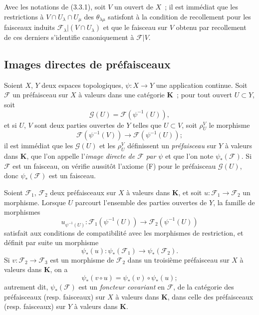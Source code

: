 \begin{env}[3.3.3]
\label{0.3.3.3-fr}
Avec les notations de (3.3.1), soit $V$ un ouvert de $X$~; il est immédiat que
les restrictions à $V\cap U_\lambda\cap U_\mu$ des $\theta_{\lambda\mu}$
satisfont à la condition de recollement pour les faisceaux induits
$\mathcal{F}_\lambda|(V\cap U_\lambda)$ et que le faisceau sur $V$ obtenu par
recollement de ces derniers s'identifie canoniquement à $\mathcal{F}|V$.
\end{env}

\subsection{Images directes de préfaisceaux}
\label{subsection:0.3.4-fr}

\begin{env}[3.4.1]
\label{0.3.4.1-fr}
Soient $X$, $Y$ deux espaces topologiques, $\psi:X\to Y$ une application
continue. Soit $\mathcal{F}$ un préfaisceau sur $X$ à valeurs dans une
catégorie $\mathbf{K}$~; pour tout ouvert $U\subset Y$, soit
\[
  \mathcal{G}(U)=\mathcal{F}(\psi^{-1}(U)),
\]
et si $U$, $V$ sont deux parties ouvertes de $Y$ telles que $U\subset V$, soit
$\rho_U^V$ le morphisme
\[
  \mathcal{F}(\psi^{-1}(V))\to\mathcal{F}(\psi^{-1}(U));
\]
il est immédiat que les $\mathcal{G}(U)$ et les $\rho_U^V$ définissent un
\emph{préfaisceau} sur $Y$ à valeurs dans $\mathbf{K}$, que l'on appelle
l'\emph{image directe de $\mathcal{F}$ par $\psi$} et que l'on note
$\psi_*(\mathcal{F})$. Si $\mathcal{F}$ est un faisceau, on vérifie aussitôt
l'axiome (F) pour le préfaisceau $\mathcal{G}(U)$, donc
$\psi_*(\mathcal{F})$ est un faisceau.
\end{env}

\begin{env}[3.4.2]
\label{0.3.4.2-fr}
Soient $\mathcal{F}_1$, $\mathcal{F}_2$ deux préfaisceaux sur $X$ à valeurs
dans $\mathbf{K}$, et soit $u:\mathcal{F}_1\to\mathcal{F}_2$ un morphisme.
Lorsque $U$ parcourt l'ensemble des parties ouvertes de $Y$, la famille de
morphismes
\[
  u_{\psi^{-1}(U)}:
  \mathcal{F}_1(\psi^{-1}(U))\to\mathcal{F}_2(\psi^{-1}(U))
\]
satisfait aux conditions de compatibilité avec les morphismes de restriction,
et définit par suite un morphisme
\[
  \psi_*(u):\psi_*(\mathcal{F}_1)\to\psi_*(\mathcal{F}_2).
\]
Si $v:\mathcal{F}_2\to\mathcal{F}_3$ est un morphisme de $\mathcal{F}_2$ dans
un troisième préfaisceau sur $X$ à valeurs dans $\mathbf{K}$, on a
\[
  \psi_*(v\circ u)=\psi_*(v)\circ\psi_*(u);
\]
autrement dit, $\psi_*(\mathcal{F})$ est un \emph{foncteur covariant} en
$\mathcal{F}$, de la catégorie des préfaisceaux (resp. faisceaux) sur $X$ à
valeurs dans $\mathbf{K}$, dans celle des préfaisceaux (resp. faisceaux) sur
$Y$ à valeurs dans $\mathbf{K}$.
\end{env}


